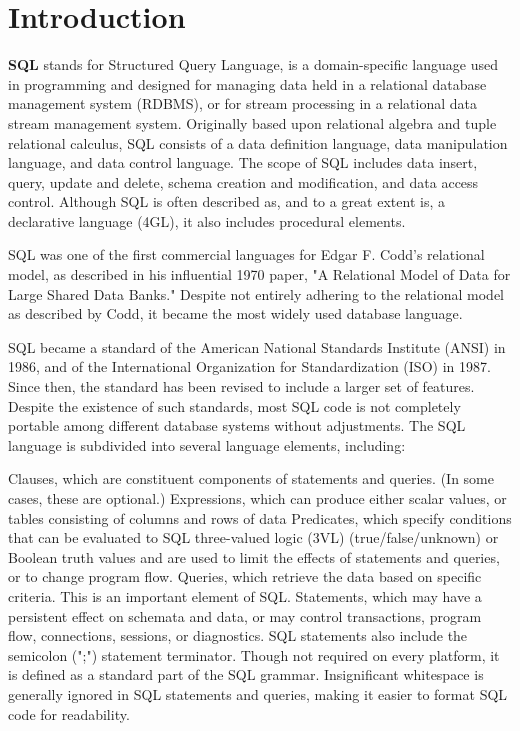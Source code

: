 \section*{Introduction}

\textbf{SQL} stands for Structured Query Language, is a domain-specific language used in programming and designed for managing data held in a relational database management system (RDBMS), or for stream processing in a relational data stream management system. Originally based upon relational algebra and tuple relational calculus, SQL consists of a data definition language, data manipulation language, and data control language. The scope of SQL includes data insert, query, update and delete, schema creation and modification, and data access control. Although SQL is often described as, and to a great extent is, a declarative language (4GL), it also includes procedural elements.

SQL was one of the first commercial languages for Edgar F. Codd's relational model, as described in his influential 1970 paper, "A Relational Model of Data for Large Shared Data Banks." Despite not entirely adhering to the relational model as described by Codd, it became the most widely used database language.

SQL became a standard of the American National Standards Institute (ANSI) in 1986, and of the International Organization for Standardization (ISO) in 1987. Since then, the standard has been revised to include a larger set of features. Despite the existence of such standards, most SQL code is not completely portable among different database systems without adjustments.
The SQL language is subdivided into several language elements, including:

Clauses, which are constituent components of statements and queries. (In some cases, these are optional.)
Expressions, which can produce either scalar values, or tables consisting of columns and rows of data
Predicates, which specify conditions that can be evaluated to SQL three-valued logic (3VL) (true/false/unknown) or Boolean truth values and are used to limit the effects of statements and queries, or to change program flow.
Queries, which retrieve the data based on specific criteria. This is an important element of SQL.
Statements, which may have a persistent effect on schemata and data, or may control transactions, program flow, connections, sessions, or diagnostics.
SQL statements also include the semicolon (";") statement terminator. Though not required on every platform, it is defined as a standard part of the SQL grammar.
Insignificant whitespace is generally ignored in SQL statements and queries, making it easier to format SQL code for readability.
\clearpage